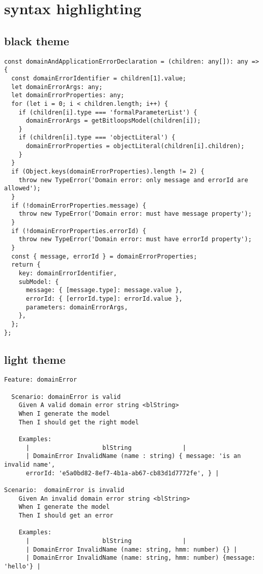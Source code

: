 \documentclass[14pt]{extarticle} %
\begin{document}
\tableofcontents
\clearpage
\section {syntax highlighting}

\subsection{black theme}
\begin{verbatim}
const domainAndApplicationErrorDeclaration = (children: any[]): any => {
  const domainErrorIdentifier = children[1].value;
  let domainErrorArgs: any;
  let domainErrorProperties: any;
  for (let i = 0; i < children.length; i++) {
    if (children[i].type === 'formalParameterList') {
      domainErrorArgs = getBitloopsModel(children[i]);
    }
    if (children[i].type === 'objectLiteral') {
      domainErrorProperties = objectLiteral(children[i].children);
    }
  }
  if (Object.keys(domainErrorProperties).length != 2) {
    throw new TypeError('Domain error: only message and errorId are allowed');
  }
  if (!domainErrorProperties.message) {
    throw new TypeError('Domain error: must have message property');
  }
  if (!domainErrorProperties.errorId) {
    throw new TypeError('Domain error: must have errorId property');
  }
  const { message, errorId } = domainErrorProperties;
  return {
    key: domainErrorIdentifier,
    subModel: {
      message: { [message.type]: message.value },
      errorId: { [errorId.type]: errorId.value },
      parameters: domainErrorArgs,
    },
  };
};
\end{verbatim} 
\subsection{light theme}
\begin{verbatim}
Feature: domainError 

  Scenario: domainError is valid
    Given A valid domain error string <blString>
    When I generate the model
    Then I should get the right model

    Examples:
      |                    blString              |
      | DomainError InvalidName (name : string) { message: 'is an invalid name', 
      errorId: 'e5a0bd82-8ef7-4b1a-ab67-cb83d1d7772fe', } |
      
Scenario:  domainError is invalid
    Given An invalid domain error string <blString>
    When I generate the model
    Then I should get an error

    Examples:
      |                    blString              |
      | DomainError InvalidName (name: string, hmm: number) {} |
      | DomainError InvalidName (name: string, hmm: number) {message: 'hello'} |
\end{verbatim}
\end{document}
